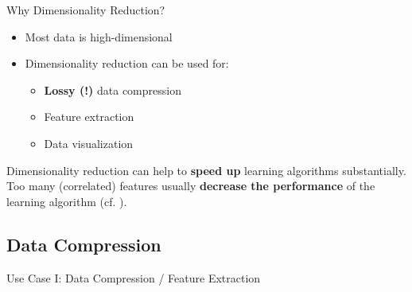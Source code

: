 \begin{frame}{Why Dimensionality Reduction?}{}
	\begin{itemize}
		\item Most data is high-dimensional
		\item Dimensionality reduction can be used for:
		\begin{itemize}
			\item \textbf{Lossy (!)} data compression
			\item Feature extraction
			\item Data visualization
		\end{itemize}
	\end{itemize}
	
	\begin{boxBlueNoFrame}
		Dimensionality reduction can help to \textbf{speed up} learning algorithms substantially.
		Too many (correlated) features usually \textbf{decrease the performance} of the learning algorithm
		(cf. ).
	\end{boxBlueNoFrame}
\end{frame}


\subsection{Data Compression}

\begin{frame}{Use Case I: Data Compression / Feature Extraction}{}
\end{frame}


